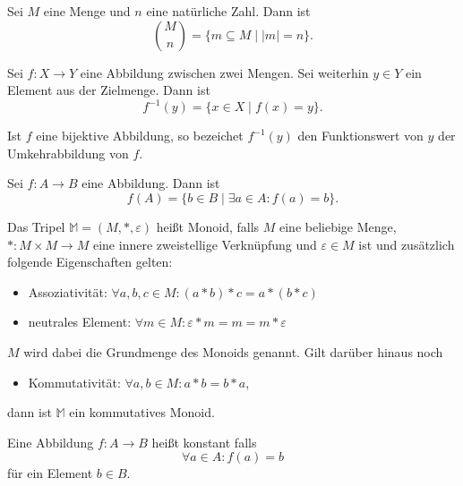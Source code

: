 \documentclass{article}
\begin{document}
\begin{definition}
  Sei $M$ eine Menge und $n$ eine natürliche Zahl. Dann ist
  \begin{equation*}
    \binom{M}{n} = \{m \subseteq M \mid |m| = n\}.
  \end{equation*}
\end{definition}

\begin{definition}
  Sei $f \colon X \to Y$ eine Abbildung zwischen zwei Mengen.
  Sei weiterhin $y \in Y$ ein Element aus der Zielmenge.
  Dann ist 
  \begin{equation*}
    f^{-1}(y) = \{ x \in X \mid f(x) = y \}.
  \end{equation*}

  Ist $f$ eine bijektive Abbildung, so bezeichet $f^{-1}(y)$
  den Funktionswert von $y$ der Umkehrabbildung von $f$.
\end{definition}

\begin{definition}
  Sei $f \colon A \to B$ eine Abbildung.
  Dann ist 
  \begin{equation*}
    f(A) = \{b \in B \mid \exists a \in A \colon f(a) = b\}.
  \end{equation*}
\end{definition}

\begin{definition}
  Das Tripel $\mathbb{M} = (M, *, \varepsilon)$ heißt Monoid, falls
  $M$ eine beliebige Menge, $* \colon M \times M \to M$ eine innere zweistellige Verknüpfung und
  $\varepsilon \in M$ ist und zusätzlich folgende Eigenschaften gelten:
  \begin{itemize}
    \item Assoziativität: $\forall a,b,c \in M \colon (a * b) * c = a * (b * c)$
    \item neutrales Element: $\forall m \in M \colon \varepsilon * m = m = m * \varepsilon$
  \end{itemize}
  $M$ wird dabei die Grundmenge des Monoids genannt. Gilt darüber hinaus noch
  \begin{itemize}
    \item Kommutativität: $\forall a,b \in M \colon a * b = b * a$,
  \end{itemize}
  dann ist $\mathbb{M}$ ein kommutatives Monoid.
\end{definition}

\begin{definition}
  Eine Abbildung $f \colon A \to B$ heißt konstant falls
  \begin{equation*}
    \forall a \in A \colon f(a) = b
  \end{equation*}
  für ein Element $b \in B$.
\end{definition}
\end{document}

